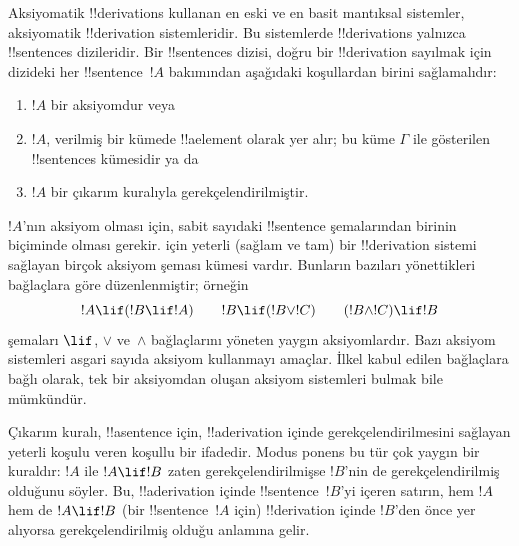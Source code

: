 \documentclass[../../../include/open-logic-section]{subfiles}
\begin{document}
      {}
      {}


Aksiyomatik !!{derivation}s kullanan en eski ve en basit mantıksal sistemler,
aksiyomatik !!{derivation} sistemleridir. Bu sistemlerde !!{derivation}s
yalnızca !!{sentence}s dizileridir. Bir !!{sentence}s dizisi, doğru bir
!!{derivation} sayılmak için dizideki her !!{sentence}~$!A$ bakımından
aşağıdaki koşullardan birini sağlamalıdır:
\begin{enumerate}
\item $!A$ bir aksiyomdur veya
\item $!A$, verilmiş bir kümede !!a{element} olarak yer alır; bu küme $\Gamma$ ile
  gösterilen !!{sentence}s kümesidir ya da
\item $!A$ bir çıkarım kuralıyla gerekçelendirilmiştir.
\end{enumerate}
$!A$'nın aksiyom olması için, sabit sayıdaki !!{sentence} şemalarından birinin
biçiminde olması gerekir. 
için yeterli (sağlam ve
tam) bir !!{derivation} sistemi sağlayan birçok aksiyom şeması kümesi vardır.
Bunların bazıları yönettikleri bağlaçlara göre düzenlenmiştir; örneğin
\[
!A \lif (!B \lif !A) \qquad !B \lif (!B \lor !C) \qquad (!B \land !C) \lif !B
\]
şemaları $\lif$, $\lor$ ve~$\land$ bağlaçlarını yöneten yaygın aksiyomlardır.
Bazı aksiyom sistemleri asgari sayıda aksiyom kullanmayı amaçlar. İlkel kabul
edilen bağlaçlara bağlı olarak, tek bir aksiyomdan oluşan aksiyom sistemleri
bulmak bile mümkündür.

Çıkarım kuralı, !!a{sentence} için, !!a{derivation} içinde
gerekçelendirilmesini sağlayan yeterli koşulu veren koşullu bir ifadedir.
Modus ponens bu tür çok yaygın
bir kuraldır: $!A$ ile $!A \lif !B$ zaten gerekçelendirilmişse $!B$'nin de
gerekçelendirilmiş olduğunu söyler. Bu, !!a{derivation} içinde
!!{sentence}~$!B$'yi içeren satırın, hem $!A$ hem de $!A \lif !B$ (bir
!!{sentence}~$!A$ için) !!{derivation} içinde $!B$'den önce yer alıyorsa
gerekçelendirilmiş olduğu anlamına gelir.
\end{document}
